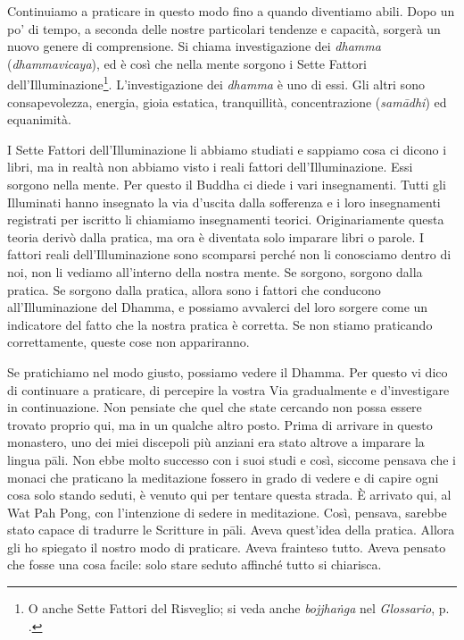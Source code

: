 Continuiamo a praticare in questo modo fino a quando diventiamo abili.
Dopo un po' di tempo, a seconda delle nostre particolari tendenze e
capacità, sorgerà un nuovo genere di comprensione. Si chiama
investigazione dei \emph{dhamma} (\emph{dhammavicaya}), ed è così che
nella mente sorgono i Sette Fattori dell'Illuminazione\footnote{O anche
  Sette Fattori del Risveglio; si veda anche \emph{bojjhaṅga} nel
  \emph{Glossario}, p. \pageref{glossary-bojjhanga}.}. L'investigazione dei \emph{dhamma} è uno di essi.
Gli altri sono consapevolezza, energia, gioia estatica, tranquillità,
concentrazione (\emph{samādhi}) ed equanimità.

I Sette Fattori dell'Illuminazione li abbiamo studiati e sappiamo cosa
ci dicono i libri, ma in realtà non abbiamo visto i reali fattori
dell'Illuminazione. Essi sorgono nella mente. Per questo il Buddha ci
diede i vari insegnamenti. Tutti gli Illuminati hanno insegnato la via
d'uscita dalla sofferenza e i loro insegnamenti registrati per iscritto
li chiamiamo insegnamenti teorici. Originariamente questa teoria derivò
dalla pratica, ma ora è diventata solo imparare libri o parole. I
fattori reali dell'Illuminazione sono scomparsi perché non li conosciamo
dentro di noi, non li vediamo all'interno della nostra mente. Se
sorgono, sorgono dalla pratica. Se sorgono dalla pratica, allora sono i
fattori che conducono all'Illuminazione del Dhamma, e possiamo avvalerci
del loro sorgere come un indicatore del fatto che la nostra pratica è
corretta. Se non stiamo praticando correttamente, queste cose non
appariranno.

Se pratichiamo nel modo giusto, possiamo vedere il Dhamma. Per questo vi
dico di continuare a praticare, di percepire la vostra Via gradualmente
e d'investigare in continuazione. Non pensiate che quel che state
cercando non possa essere trovato proprio qui, ma in un qualche altro
posto. Prima di arrivare in questo monastero, uno dei miei discepoli più
anziani era stato altrove a imparare la lingua pāli. Non ebbe molto
successo con i suoi studi e così, siccome pensava che i monaci che
praticano la meditazione fossero in grado di vedere e di capire ogni
cosa solo stando seduti, è venuto qui per tentare questa strada. È
arrivato qui, al Wat Pah Pong, con l'intenzione di sedere in
meditazione. Così, pensava, sarebbe stato capace di tradurre le
Scritture in pāli. Aveva quest'idea della pratica. Allora gli ho
spiegato il nostro modo di praticare. Aveva frainteso tutto. Aveva
pensato che fosse una cosa facile: solo stare seduto affinché tutto si
chiarisca.

